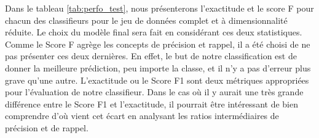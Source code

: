 Dans le tableau \ref{tab:perfo_test}, nous présenterons l'exactitude et le score F pour chacun des classifieurs pour le jeu de données complet et à dimensionnalité réduite. Le choix du modèle final sera fait en considérant ces deux statistiques. \\

Comme le Score F agrège les concepts de précision et rappel, il a été choisi de ne pas présenter ces deux dernières. En effet, le but de notre classification est de donner la meilleure prédiction, peu importe la classe, et il n'y a pas d'erreur plus grave qu'une autre. L'exactitude ou le Score F1 sont deux métriques appropriées pour l'évaluation de notre classifieur. Dans le cas où il y aurait une très grande différence entre le Score F1 et l'exactitude, il pourrait être intéressant de bien comprendre d'où vient cet écart en analysant les ratios intermédiaires de précision et de rappel.

\begin{table}[H]
	
\caption{\label{tab:}Performances des différents modèles sur le jeu de données de test selon les différentes mesures de performance.}
\centering
{}

\end{table}

